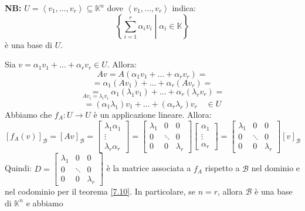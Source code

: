 \documentclass[a4paper]{article}
\theoremstyle{break}
\theoremstyle{break}
\theoremstyle{break}
\theoremstyle{break}
\begin{document}
\noindent \textbf{NB:} \( U = \left< v_1, \ldots, v_r \right> \subseteq \mathbb{K}^n \) 
dove \( \left< v_1, \ldots, v_r \right> \) indica:
\[
  \left\{\left. \sum_{i = 1}^r \alpha_i v_i \;\right|\; \alpha_i \in \mathbb{K} \right\} 
\] 
è una base di \( U \).

\vspace{1em}
\noindent Sia \( v = \alpha_1 v_1 + \ldots + \alpha_r v_r \in U \). Allora:
\[
Av = A(\alpha_1 v_1 + \ldots + \alpha_r v_r) = 
\] 
\[
= \alpha_1 (Av_1) + \ldots + \alpha_r (Av_r) =
\] 
\[
  \underset{A v_i = \lambda_i v_i}{=} \alpha_1 (\lambda_1 v_1) + \ldots + \alpha_r (\lambda_r v_r) =
\] 
\[
= (\alpha_1 \lambda_1) v_1 + \ldots + (\alpha_r \lambda_r) v_r  \quad \in U
\] 
Abbiamo che \( f_A: U \to U \) è un applicazione lineare. Allora:
\[
 [f_A(v)]_{\mathcal{B}} = [Av]_{\mathcal{B}} = \begin{bmatrix} 
   \lambda_1 \alpha_1\\
   \vdots\\
   \lambda_r \alpha_r
  \end{bmatrix}
  =
  \begin{bmatrix} 
    \lambda_1& 0 & 0\\
    0 & \ddots & 0\\
    0 & 0 & \lambda_r
  \end{bmatrix} 
  \begin{bmatrix} 
    \alpha_1\\
    \vdots\\
    \alpha_r
  \end{bmatrix} 
  =
  \begin{bmatrix} 
    \lambda_1& 0 & 0\\
    0 & \ddots & 0\\
    0 & 0 & \lambda_r
  \end{bmatrix} 
  [v]_{\mathcal{B}}
\] 
Quindi:
\(
D = \begin{bmatrix} 
  \lambda_1& 0 & 0\\
  0 & \ddots & 0\\
  0 & 0 & \lambda_r
\end{bmatrix} 
\) 
è la matrice associata a \( f_A \) rispetto a \( \mathcal{B} \) nel dominio e nel
codominio per il teorema \ref{7.10}. In particolare, se \( n = r \), allora
\( \mathcal{B} \) è una base di \( \mathbb{K}^n \) e abbiamo
\end{document}
